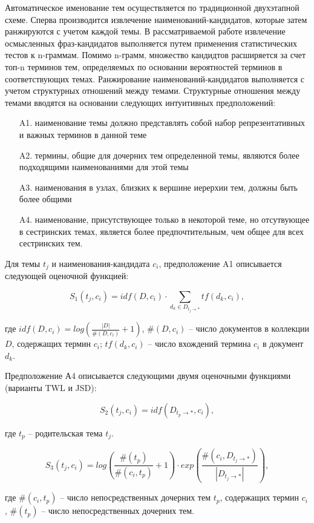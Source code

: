 Автоматическое именование тем осуществляется по традиционной двухэтапной схеме. Сперва производится извлечение наименований-кандидатов, которые затем ранжируются с учетом каждой темы. В рассматриваемой работе извлечение осмысленных фраз-кандидатов выполняется путем применения статистических тестов к n-граммам. Помимо n-грамм, множество кандидтов расширяется за счет топ-n терминов тем, определяемых по основании вероятностей терминов в соответствующих темах. Ранжирование наименований-кандидатов выполняется с учетом структурных отношений между темами. Структурные отношения между темами вводятся на основании следующих интуитивных предположений:
\begin{itemize}
    \item[A1.] наименование темы должно представлять собой набор репрезентативных и важных терминов в данной теме  
    \item[A2.] термины, общие для дочерних тем определенной темы, являются более подходящими наименованиями для этой темы
    \item[A3.] наименования в узлах, близких к вершине иерерхии тем, должны быть более общими
    \item[A4.] наименование, присутствующее только в некоторой теме, но отсутвующее в сестринских темах, является более предпочтительным, чем общее для всех сестринских тем.
\end{itemize}

Для темы $t_j$ и наименования-кандидата $c_i$, предположение A1 описывается следующей оценочной функцией:

\[ S_1(t_j, c_i) = idf(D, c_i) \cdot \sum_{d_k \in D_{t_j \to *}}tf(d_k, c_i), \]

\noindent где $idf(D, c_i) = log(\frac{|D|}{\#(D, c_i)} + 1)$, $\#(D, c_i)$ -- число документов в коллекции $D$, содержащих термин $c_i$; $tf(d_k, c_i)$ -- число вхождений термина $c_i$ в документ $d_k$.

Предположение А4 описывается следующими двумя оценочными функциями (варианты TWL и JSD):

\[ S_2(t_j, c_i) = idf(D_{t_p \to *}, c_i), \]

\noindent где $t_p$ -- родительская тема $t_j$.

\[ S_3(t_j, c_i) = log(\frac{\#(t_p)}{\#(c_i, t_p)} + 1) \cdot exp(\frac{\#(c_i, D_{t_j \to *})}{|D_{t_j \to *}|}), \]

\noindent где $\#(c_i, t_p)$ -- число непосредственных дочерних тем $t_p$, содержащих термин $c_i$, $\#(t_p)$ -- число непосредственных дочерних тем.

